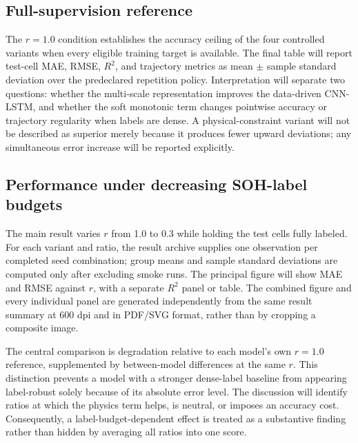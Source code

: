 \documentclass[a4paper,fleqn]{cas-dc}
\begin{document}
\subsection{Full-supervision reference}
\label{subsec:new_full_supervision}

The $r=1.0$ condition establishes the accuracy ceiling of the four controlled variants when every eligible training target is available. The final table will report test-cell MAE, RMSE, $R^2$, and trajectory metrics as mean $\pm$ sample standard deviation over the predeclared repetition policy. Interpretation will separate two questions: whether the multi-scale representation improves the data-driven CNN-LSTM, and whether the soft monotonic term changes pointwise accuracy or trajectory regularity when labels are dense. A physical-constraint variant will not be described as superior merely because it produces fewer upward deviations; any simultaneous error increase will be reported explicitly.

\subsection{Performance under decreasing SOH-label budgets}
\label{subsec:new_label_budget}

The main result varies $r$ from 1.0 to 0.3 while holding the test cells fully labeled. For each variant and ratio, the result archive supplies one observation per completed seed combination; group means and sample standard deviations are computed only after excluding smoke runs. The principal figure will show MAE and RMSE against $r$, with a separate $R^2$ panel or table. The combined figure and every individual panel are generated independently from the same result summary at 600 dpi and in PDF/SVG format, rather than by cropping a composite image.

The central comparison is degradation relative to each model's own $r=1.0$ reference, supplemented by between-model differences at the same $r$. This distinction prevents a model with a stronger dense-label baseline from appearing label-robust solely because of its absolute error level. The discussion will identify ratios at which the physics term helps, is neutral, or imposes an accuracy cost. Consequently, a label-budget-dependent effect is treated as a substantive finding rather than hidden by averaging all ratios into one score.
\end{document}
